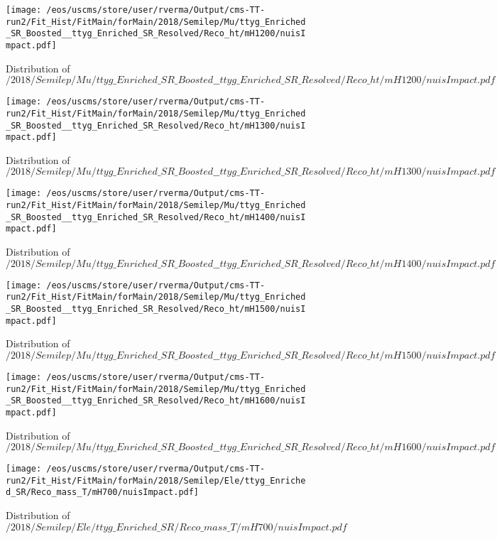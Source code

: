 \begin{figure}
\centering
\texttt{[image: /eos/uscms/store/user/rverma/Output/cms-TT-run2/Fit\_Hist/FitMain/forMain/2018/Semilep/Mu/ttyg\_Enriched\_SR\_Boosted\_\_ttyg\_Enriched\_SR\_Resolved/Reco\_ht/mH1200/nuisImpact.pdf]}
\caption{Distribution of $/2018/Semilep/Mu/ttyg\_Enriched\_SR\_Boosted\_\_ttyg\_Enriched\_SR\_Resolved/Reco\_ht/mH1200/nuisImpact.pdf$}
\end{figure}

\begin{figure}
\centering
\texttt{[image: /eos/uscms/store/user/rverma/Output/cms-TT-run2/Fit\_Hist/FitMain/forMain/2018/Semilep/Mu/ttyg\_Enriched\_SR\_Boosted\_\_ttyg\_Enriched\_SR\_Resolved/Reco\_ht/mH1300/nuisImpact.pdf]}
\caption{Distribution of $/2018/Semilep/Mu/ttyg\_Enriched\_SR\_Boosted\_\_ttyg\_Enriched\_SR\_Resolved/Reco\_ht/mH1300/nuisImpact.pdf$}
\end{figure}

\begin{figure}
\centering
\texttt{[image: /eos/uscms/store/user/rverma/Output/cms-TT-run2/Fit\_Hist/FitMain/forMain/2018/Semilep/Mu/ttyg\_Enriched\_SR\_Boosted\_\_ttyg\_Enriched\_SR\_Resolved/Reco\_ht/mH1400/nuisImpact.pdf]}
\caption{Distribution of $/2018/Semilep/Mu/ttyg\_Enriched\_SR\_Boosted\_\_ttyg\_Enriched\_SR\_Resolved/Reco\_ht/mH1400/nuisImpact.pdf$}
\end{figure}

\begin{figure}
\centering
\texttt{[image: /eos/uscms/store/user/rverma/Output/cms-TT-run2/Fit\_Hist/FitMain/forMain/2018/Semilep/Mu/ttyg\_Enriched\_SR\_Boosted\_\_ttyg\_Enriched\_SR\_Resolved/Reco\_ht/mH1500/nuisImpact.pdf]}
\caption{Distribution of $/2018/Semilep/Mu/ttyg\_Enriched\_SR\_Boosted\_\_ttyg\_Enriched\_SR\_Resolved/Reco\_ht/mH1500/nuisImpact.pdf$}
\end{figure}

\begin{figure}
\centering
\texttt{[image: /eos/uscms/store/user/rverma/Output/cms-TT-run2/Fit\_Hist/FitMain/forMain/2018/Semilep/Mu/ttyg\_Enriched\_SR\_Boosted\_\_ttyg\_Enriched\_SR\_Resolved/Reco\_ht/mH1600/nuisImpact.pdf]}
\caption{Distribution of $/2018/Semilep/Mu/ttyg\_Enriched\_SR\_Boosted\_\_ttyg\_Enriched\_SR\_Resolved/Reco\_ht/mH1600/nuisImpact.pdf$}
\end{figure}

\begin{figure}
\centering
\texttt{[image: /eos/uscms/store/user/rverma/Output/cms-TT-run2/Fit\_Hist/FitMain/forMain/2018/Semilep/Ele/ttyg\_Enriched\_SR/Reco\_mass\_T/mH700/nuisImpact.pdf]}
\caption{Distribution of $/2018/Semilep/Ele/ttyg\_Enriched\_SR/Reco\_mass\_T/mH700/nuisImpact.pdf$}
\end{figure}

